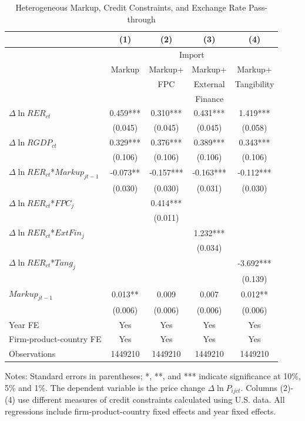\documentclass[12pt]{article}
\begin{document}
\begin{table}[htbp]
	\centering
	\caption{Heterogeneous Markup, Credit Constraints, and Exchange Rate Pass-through}
	\begin{threeparttable}
		\begin{tabular}{lcccc}
			\midrule          & (1)   & (2)   & (3)   & (4)     \\
			\midrule
			& \multicolumn{4}{c}{Import} \\
			& Markup & Markup+& Markup+ & Markup+      \\
			&       & FPC & External & Tangibility        \\
			&       & & Finance &  	          \\
			\midrule
			$\Delta \ln RER_{ct}$ & 0.459*** & 0.310*** & 0.431*** & 1.419***   \\
			& (0.045) & (0.045) & (0.045) & (0.058) \\
			$\Delta \ln RGDP_{ct}$ & 0.329*** & 0.376*** & 0.389*** & 0.343*** \\
			& (0.106) & (0.106) & (0.106) & (0.106)  \\
			$\Delta \ln RER_{ct}$*$Markup_{jt-1}$ & -0.073** & -0.157*** & -0.163*** & -0.112*** \\
			& (0.030) & (0.030) & (0.031) & (0.030) \\
			$\Delta \ln RER_{ct}$*$FPC_{j}$ &       & 0.414*** &       &  \\
			&       & (0.011) &       &   \\
			$\Delta \ln RER_{ct}$*$ExtFin_{j}$ &       &       & 1.232*** &  \\
			&       &       & (0.034) &   \\
			$\Delta \ln RER_{ct}$*$Tang_{j}$  &       &       &       & -3.692*** \\
			&       &       &       & (0.139) \\
			$Markup_{jt-1}$ & 0.013** & 0.009 & 0.007 & 0.012**  \\
			& (0.006) & (0.006) & (0.006) & (0.006)  \\
			Year FE  & Yes   & Yes   & Yes   & Yes       \\
			Firm-product-country FE & Yes   & Yes   & Yes   & Yes       \\
			Observations & 1449210 & 1449210 & 1449210 & 1449210  \\
			\bottomrule
		\end{tabular}
		\begin{tablenotes}
			\footnotesize
			\item[Notes:] Standard errors in parentheses; *, **, and *** indicate significance at 10\%, 5\% and 1\%. The dependent variable is the price change $\Delta \ln P_{ijct}$. Columns (2)-(4) use different measures of credit constraints calculated using U.S. data. All regressions include firm-product-country fixed effects and year fixed effects.
		\end{tablenotes}
	\end{threeparttable}
        \label{tab.markup}
\end{table}
\end{document}
